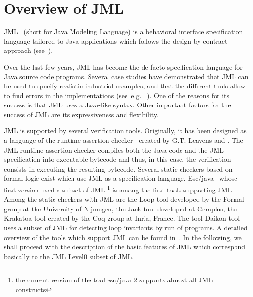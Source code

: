 


\section{Overview of JML} \label{BCSLprelim}
JML~\cite{JMLRefMan} (short for Java Modeling Language) is a behavioral interface specification 
language tailored to Java applications which follows the design-by-contract approach (see~\cite{M97oos}).

Over the last few years, JML has become the de facto specification language for
 Java source code programs. Several case studies have demonstrated that JML can be used to specify realistic
industrial examples, and that the different tools allow to find errors
in the implementations (see~e.g. \/~\cite{BreunesseCHJ04}). One
of the reasons for its success is that JML uses a Java-like
syntax.  Other important factors for the success of JML are its expressiveness and
flexibility.

JML is supported by several verification tools.
 Originally, it has been designed as a language of the runtime assertion checker~\cite{jmlrac} created by G.T. Leavens and . 
The JML runtime assertion checker compiles both the Java code and the JML specification into executable bytecode and thus, 
in this case, the verification consists in executing the resulting bytecode. Several static checkers based 
on formal logic exist which use JML as a specification language. Esc/java~\cite{escjava}  whose first version used a subset 
 of JML \footnote{the current version of the tool esc/java 2  supports almost all JML constructs} is among the first tools supporting JML.
Among the static checkers with JML  are
the Loop tool developed by the Formal group at the University of Nijmegen,
the Jack tool developed at Gemplus, the Krakatoa tool created by the Coq group at Inria, France.
The tool Daikon \cite{ECG01DDL}  tool uses a subset of JML for detecting loop invariants by run of programs.
 A  detailed overview of the tools which support JML can  be found in~\cite{BurdyCCEKLLP03}.
In the following, we shall proceed with the description of the basic features of JML which correspond basically to the
JML Level0 subset of JML. 



